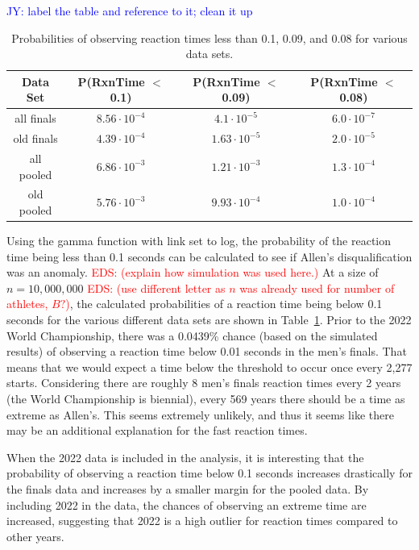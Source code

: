 \documentclass[12pt, letterpaper, titlepage]{article}
\newcommand{\jy}[1]{\textcolor{blue}{JY: #1}}
\newcommand{\eds}[1]{\textcolor{red}{EDS: (#1)}}
\begin{document}
\jy{label the table and reference to it; clean it up}
\begin{table}
  \centering
  \caption{Probabilities of observing reaction times less than 0.1, 0.09, and
  0.08 for various data sets.}
  \begin{tabular}{c c c c} 
   \toprule
   Data Set & P(RxnTime $<$ 0.1) & P(RxnTime $<$ 0.09) & P(RxnTime $<$ 0.08) \\ 
   \midrule
   all finals & $8.56\cdot10^{-4}$ & $4.1\cdot10^{-5}$ & $6.0\cdot10^{-7}$ \\ 
   old finals & $4.39\cdot10^{-4}$ & $1.63\cdot10^{-5}$ & $2.0\cdot10^{-5}$ \\
   all pooled & $6.86\cdot10^{-3}$ & $1.21\cdot10^{-3}$ & $1.3\cdot10^{-4}$ \\
   old pooled & $5.76\cdot10^{-3}$ & $9.93\cdot10^{-4}$ & $1.0\cdot10^{-4}$\\
   \bottomrule
  \end{tabular}
  \label{tab:Sim_probability}
\end{table}

Using the gamma function with link set to log, the probability of the reaction 
time being less than 0.1 seconds can be calculated to see if Allen's 
disqualification was an anomaly. \eds{explain how simulation was used here.}
At a size of $n=10,000,000$ \eds{use different letter as $n$ was already used 
for number of athletes, $B?$}, the calculated probabilities of a reaction time 
being below 0.1 seconds for the various different data sets are shown in 
Table~\ref{tab:Sim_probability}. Prior to the 2022 World Championship, there was 
a 0.0439\% chance (based on the
simulated results) of observing a reaction time below 0.01 seconds in the men's
finals.
That means that we would expect a time below the threshold to occur
once every 2,277 starts.  Considering there are roughly 8 men's finals reaction
times every 2 years (the World Championship is biennial), every 569 years there
should be a time as extreme as Allen's. This seems extremely unlikely, and thus
it seems like there may be an additional explanation for the fast reaction times.


When the 2022 data is included in the analysis, it is interesting that the 
probability of observing a reaction time below 0.1 seconds increases drastically 
for the finals data and increases by a smaller margin for the pooled data.  By
including 2022 in the data, the chances of observing an extreme time are 
increased, suggesting that 2022 is a high outlier for reaction times compared to
 other years.
\end{document}

